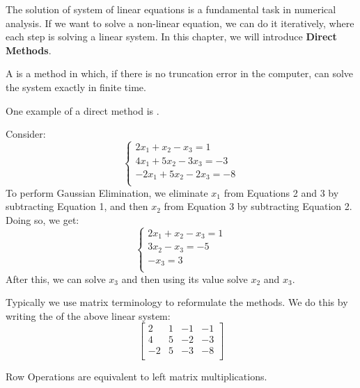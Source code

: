 \documentclass[../main/main.tex]{subfiles}
\begin{document}
The solution of system of linear equations is a fundamental task in numerical analysis. If we want to solve a non-linear equation, we can do it iteratively, where each step is solving a linear system. In this chapter, we will introduce \textbf{Direct Methods}.

\begin{definition}
A  is a method in which, if there is no truncation error in the computer, can solve the system exactly in finite time.
\end{definition}

One example of a direct method is .

\begin{example}
  \label{2-2-ex1}
  Consider:
  \[
    \begin{cases}
      2x_1+x_2-x_3 = 1 \\
      4x_1+5x_2- 3x_3 = -3 \\
      -2x_1+5x_2-2x_3 = -8\\
    \end{cases}
  \]
  To perform Gaussian Elimination, we eliminate $x_1$ from Equations 2 and 3 by subtracting Equation 1, and then $x_{2}$ from Equation 3 by subtracting Equation 2. Doing so, we get: \[
    \begin{cases}
      2x_1+x_2-x_3 = 1 \\
      3x_{2}- x_3 = -5 \\
      -x_3 = 3\\
    \end{cases}
  \]
  After this, we can solve $x_{3}$ and then using its value solve $x_2$ and $x_{3}$.
\end{example}

Typically we use matrix terminology to reformulate the methods. We do this by writing the  of the above linear system:
\[
  \left[
\begin{array}{ccc|c}
  2&1&-1&-1 \\
  4&5&-2&-3 \\
  -2&5&-3&-8 \\
\end{array}
\right]
\]

\begin{lemma}
Row Operations are equivalent to left matrix multiplications.
\end{lemma}
\end{document}

